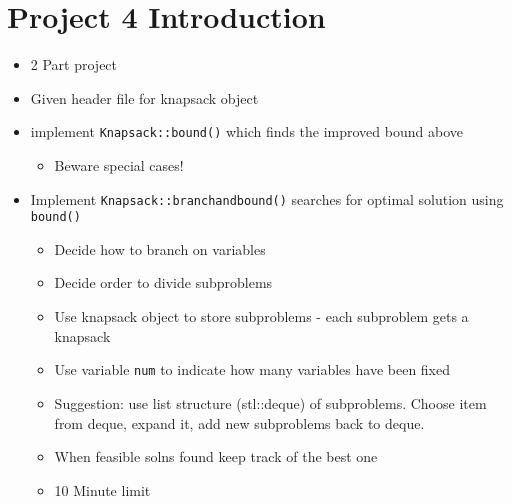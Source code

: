 \documentclass[12pt, letter]{article}
\begin{document}
\section{Project 4 Introduction}%
\label{sec:project_4_introduction}
\begin{itemize}
	\item 2 Part project
	\item Given header file for knapsack object
	\item implement \texttt{Knapsack::bound()} which finds the improved bound above
	\begin{itemize}
		\item Beware special cases!
	\end{itemize}
	\item Implement \texttt{Knapsack::branchandbound()} searches for optimal solution using \texttt{bound()} 
	\begin{itemize}
		\item Decide how to branch on variables
		\item Decide order to divide subproblems
		\item Use knapsack object to store subproblems - each subproblem gets a knapsack
		\item Use variable \texttt{num} to indicate how many variables have been fixed
		\item Suggestion: use list structure (stl::deque) of subproblems. Choose item from deque, expand it, add new subproblems back to deque.
		\item When feasible solns found keep track of the best one
		\item 10 Minute limit
	\end{itemize}
\end{itemize}
\end{document}
